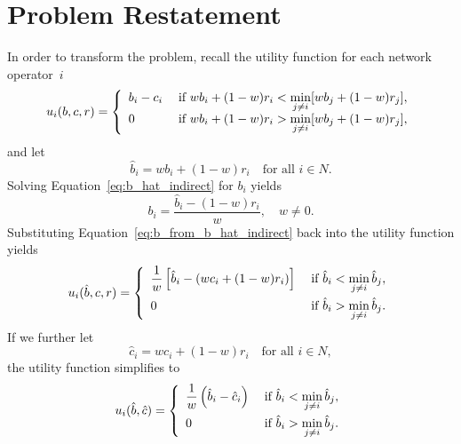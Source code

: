 \section{Problem Restatement} %
\label{sec:problem_restatement_indirect}
In order to transform the problem, recall the utility function for each network operator~$i$
\begin{equation*}
  u_i(b,c,r) = \left\{
  \begin{array}{l l}
    b_i-c_i & \;\textrm{if } wb_i + (1-w)r_i < \displaystyle\min_{j\neq i}[wb_j + (1-w)r_j],\\
    0 & \;\textrm{if } wb_i + (1-w)r_i > \displaystyle\min_{j\neq i}[wb_j + (1-w)r_j],
  \end{array}\right.
\end{equation*}
and let
\begin{equation}
  \label{eq:b_hat_indirect}
  \hat{b}_i = wb_i + (1-w)r_i \quad\textrm{for all } i\in N.
\end{equation}
Solving Equation~\eqref{eq:b_hat_indirect} for $b_i$ yields
\begin{equation}
  \label{eq:b_from_b_hat_indirect}
  b_i = \frac{\hat{b}_i - (1-w)r_i}{w}, \quad w\neq 0.
\end{equation}
Substituting Equation~\eqref{eq:b_from_b_hat_indirect} back into the utility function yields
\begin{equation*}
  u_i(\hat{b},c,r) = \left\{
  \begin{array}{l l}
    \displaystyle\frac{1}{w}\left[\hat{b}_i-(wc_i + (1-w)r_i)\right] & \;\textrm{if } \hat{b}_i < \displaystyle\min_{j\neq i}\hat{b}_j,\\[2ex]
    0 & \;\textrm{if } \hat{b}_i > \displaystyle\min_{j\neq i}\hat{b}_j.
  \end{array}\right.
\end{equation*}
If we further let
\begin{equation}
  \label{eq:cost_hat_indirect}
  \hat{c}_i = wc_i + (1-w)r_i \quad\textrm{for all } i\in N,
\end{equation}
the utility function simplifies to
\begin{equation}
  \label{eq:sellers_utility_hat_full_indirect}
  u_i(\hat{b},\hat{c}) = \left\{
  \begin{array}{l l}
    \displaystyle\frac{1}{w}\left(\hat{b}_i-\hat{c}_i\right) & \;\textrm{if } \hat{b}_i < \displaystyle\min_{j\neq i}\hat{b}_j,\\[2ex]
    0 & \;\textrm{if } \hat{b}_i > \displaystyle\min_{j\neq i}\hat{b}_j.
  \end{array}\right.
\end{equation}

